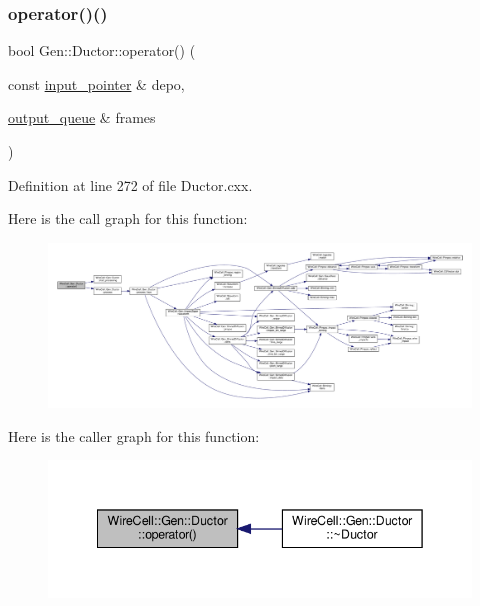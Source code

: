 \subsubsection{\texorpdfstring{operator()()}{operator()()}}
{\footnotesize\ttfamily bool Gen\+::\+Ductor\+::operator() (\begin{DoxyParamCaption}\item[{const \hyperlink{class_wire_cell_1_1_i_queuedout_node_acf5f716a764553f3c7055a9cf67e906e}{input\+\_\+pointer} \&}]{depo,  }\item[{\hyperlink{class_wire_cell_1_1_i_queuedout_node_a39018e4e3dd886befac9636ac791a685}{output\+\_\+queue} \&}]{frames }\end{DoxyParamCaption})\hspace{0.3cm}{\ttfamily [virtual]}}



Definition at line 272 of file Ductor.\+cxx.

Here is the call graph for this function\+:
\nopagebreak
\begin{figure}[H]
\begin{center}
\leavevmode
\includegraphics[width=350pt]{class_wire_cell_1_1_gen_1_1_ductor_a1a103a685f920781c7d312f168b52841_cgraph}
\end{center}
\end{figure}
Here is the caller graph for this function\+:
\nopagebreak
\begin{figure}[H]
\begin{center}
\leavevmode
\includegraphics[width=342pt]{class_wire_cell_1_1_gen_1_1_ductor_a1a103a685f920781c7d312f168b52841_icgraph}
\end{center}
\end{figure}
\mbox{\label{class_wire_cell_1_1_gen_1_1_ductor_a1454baebba2e385dea9cd098236dd515}} 
